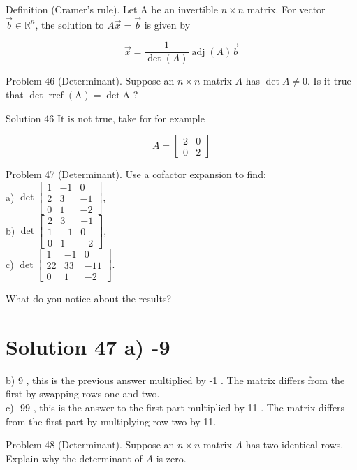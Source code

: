 \documentclass[10pt]{article}
\begin{document}
Definition (Cramer's rule). Let A be an invertible $n \times n$ matrix. For vector $\vec{b} \in \mathbb{R}^{n}$, the solution to $A \vec{x}=\vec{b}$ is given by

$$
\vec{x}=\frac{1}{\operatorname{det}(A)} \operatorname{adj}(A) \vec{b}
$$

Problem 46 (Determinant). Suppose an $n \times n$ matrix $A$ has $\operatorname{det} A \neq 0$. Is it true that $\operatorname{det} \operatorname{rref}(\mathrm{A})=\operatorname{det} \mathrm{A}$ ?

Solution 46 It is not true, take for for example

$$
A=\left[\begin{array}{ll}
2 & 0 \\
0 & 2
\end{array}\right]
$$

Problem 47 (Determinant). Use a cofactor expansion to find:\\
a) $\operatorname{det}\left[\begin{array}{ccc}1 & -1 & 0 \\ 2 & 3 & -1 \\ 0 & 1 & -2\end{array}\right]$,\\
b) $\operatorname{det}\left[\begin{array}{ccc}2 & 3 & -1 \\ 1 & -1 & 0 \\ 0 & 1 & -2\end{array}\right]$,\\
c) $\operatorname{det}\left[\begin{array}{ccc}1 & -1 & 0 \\ 22 & 33 & -11 \\ 0 & 1 & -2\end{array}\right]$.

What do you notice about the results?

\section*{Solution 47 a) -9}
b) 9 , this is the previous answer multiplied by -1 . The matrix differs from the first by swapping rows one and two.\\
c) -99 , this is the answer to the first part multiplied by 11 . The matrix differs from the first part by multiplying row two by 11.

Problem 48 (Determinant). Suppose an $n \times n$ matrix $A$ has two identical rows. Explain why the determinant of $A$ is zero.
\end{document}
